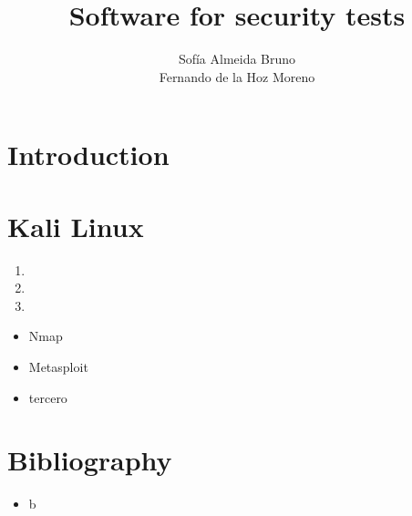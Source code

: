\documentclass{beamer}
\title{Software for security tests}
\subtitle{}
\author{Sofía Almeida Bruno\\\qquad\quad Fernando de la Hoz Moreno}
\date{}
\begin{document}
\begin{frame}
  \maketitle
\end{frame}

\begin{frame}{}
  \tableofcontents
\end{frame}

\section{Introduction}

\section{Kali Linux}
\begin{frame}
  

  \pause

  \begin{enumerate}
  \item \pause
  \item \pause
  \item 
  \end{enumerate}

  \pause

  \begin{itemize}
  \item Nmap\pause
  \item Metasploit\pause
  \item tercero
  \end{itemize}
\end{frame}

\section{Bibliography}
\begin{frame}
	\begin{itemize}
		\item b
	\end{itemize}
\end{frame}
\end{document}
